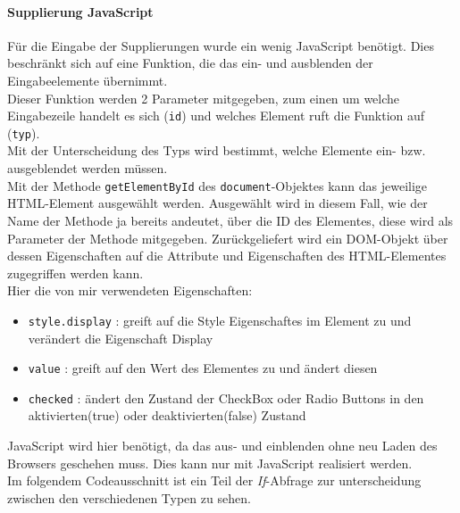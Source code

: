 \paragraph{Supplierung JavaScript\\}\label{sec:content_imple_input_java_supp}
Für die Eingabe der Supplierungen wurde ein wenig JavaScript benötigt. Dies beschränkt sich auf eine Funktion, die das ein- und ausblenden der Eingabeelemente übernimmt.\\
Dieser Funktion werden 2 Parameter mitgegeben, zum einen um welche Eingabezeile handelt es sich (\texttt{id}) und welches Element ruft die Funktion auf (\texttt{typ}).\\
Mit der Unterscheidung des Typs wird bestimmt, welche Elemente ein- bzw. ausgeblendet werden müssen.\\
Mit der Methode \texttt{getElementById} des \texttt{document}-Objektes kann das jeweilige HTML-Element ausgewählt werden. Ausgewählt wird in diesem Fall, wie der Name der Methode ja bereits andeutet, über die ID des Elementes, diese wird als Parameter der Methode mitgegeben. Zurückgeliefert wird ein DOM-Objekt über dessen Eigenschaften auf die Attribute und Eigenschaften des HTML-Elementes zugegriffen werden kann.\\
Hier die von mir verwendeten Eigenschaften:
\begin{itemize}
	\item \texttt{style.display} : greift auf die Style Eigenschaftes im Element zu und verändert die Eigenschaft Display
	\item \texttt{value} : greift auf den Wert des Elementes zu und ändert diesen
	\item \texttt{checked} : ändert den Zustand der CheckBox oder Radio Buttons in den aktivierten(true) oder deaktivierten(false) Zustand
\end{itemize}
JavaScript wird hier benötigt, da das aus- und einblenden ohne neu Laden des Browsers geschehen muss. Dies kann nur mit JavaScript realisiert werden.\\
Im folgendem Codeausschnitt ist ein Teil der \textit{If}-Abfrage zur unterscheidung zwischen den verschiedenen Typen zu sehen.

